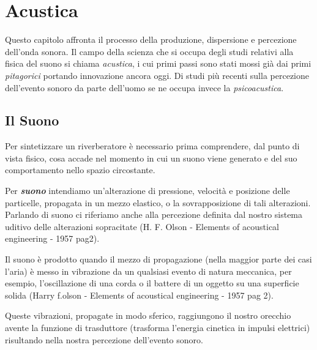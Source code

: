 
\chapter{Acustica}
\label{chp:Acustica}

Questo capitolo affronta il processo della produzione, dispersione e percezione dell'onda sonora. Il campo della scienza che si occupa degli studi relativi alla fisica del suono si chiama \emph{acustica}, i cui primi passi sono stati mossi già dai primi \textit{pitagorici} portando innovazione ancora oggi. Di studi più recenti sulla percezione dell'evento sonoro da parte dell'uomo se ne occupa invece la \textit{psicoacustica}.  

\section{Il Suono}

Per sintetizzare un riverberatore è necessario prima comprendere, dal punto di vista fisico, cosa accade nel momento in cui un suono viene generato e del suo comportamento nello spazio circostante.

Per \textbf{\textit{suono}} intendiamo un'alterazione di pressione, velocità e posizione delle particelle, propagata in un mezzo elastico, o la sovrapposizione di tali alterazioni.
Parlando di suono ci riferiamo anche alla percezione definita dal nostro sistema uditivo delle alterazioni sopracitate (H. F. Olson - Elements of acoustical engineering - 1957 pag2).

Il suono è prodotto quando il mezzo di propagazione (nella maggior parte dei casi l'aria)
è messo in vibrazione da un qualsiasi evento di natura meccanica, per esempio, l'oscillazione di una corda o il battere di un oggetto su una superficie solida  (Harry f.olson - Elements of acoustical engineering - 1957 pag 2).

Queste vibrazioni, propagate in modo sferico, raggiungono il nostro orecchio avente la funzione di trasduttore (trasforma l'energia cinetica in impulsi elettrici) risultando nella nostra percezione dell'evento sonoro.

